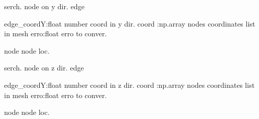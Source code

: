 \documentclass[letterpaper,10pt,english]{sphinxmanual}
\begin{document}

\begin{fulllineitems}
\label{\detokenize{myfempy.felib.physics:myfempy.felib.physics.getnode.search_edgey}}
\pysigstartsignatures
{}
\pysigstopsignatures
\sphinxAtStartPar
serch. node  on y dir. edge
\begin{description}
\sphinxAtStartPar
edge\_coordY:float   \textendash{} number coord in y dir.
coord :np.array     \textendash{} nodes coordinates list in mesh
erro:float          \textendash{} erro to conver.

\sphinxAtStartPar
node                \textendash{} node loc.

\end{description}

\end{fulllineitems}


\begin{fulllineitems}
\label{\detokenize{myfempy.felib.physics:myfempy.felib.physics.getnode.search_edgez}}
\pysigstartsignatures
{}
\pysigstopsignatures
\sphinxAtStartPar
serch. node  on z dir. edge
\begin{description}
\sphinxAtStartPar
edge\_coordY:float   \textendash{} number coord in z dir.
coord :np.array     \textendash{} nodes coordinates list in mesh
erro:float          \textendash{} erro to conver.

\sphinxAtStartPar
node                \textendash{} node loc.

\end{description}

\end{fulllineitems}
\end{document}

